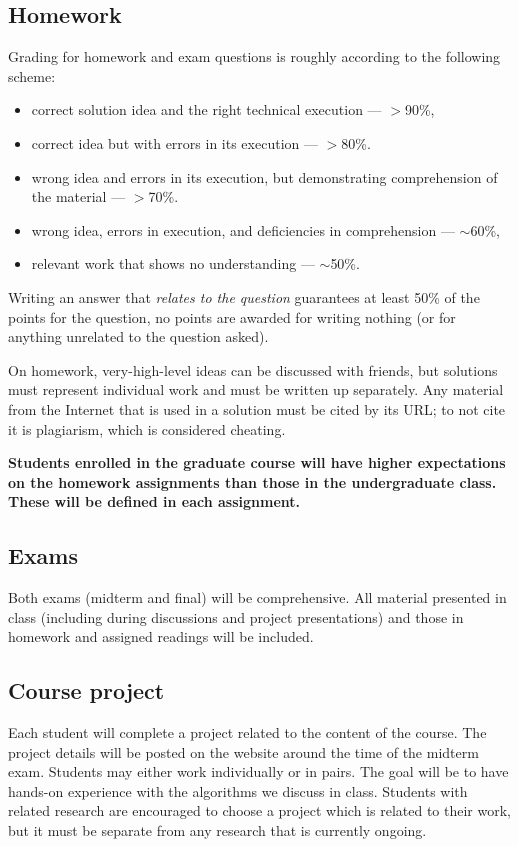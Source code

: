 \documentclass[12pt]{scrartcl}
\begin{document}
\subsection{Homework }

Grading for homework and exam questions is roughly according to the following scheme:
\begin{itemize}
\item correct solution idea and the right technical execution --- $>$90\%, 
\item correct idea but with errors in its execution --- $>$80\%. 
\item wrong idea and errors in its execution, but demonstrating comprehension of the material --- $>$70\%. 
\item wrong idea, errors in execution, and deficiencies in comprehension --- $\sim$60\%, 
\item relevant work that shows no understanding --- $\sim$50\%.
\end{itemize}
Writing an answer that \emph{relates to the question} guarantees at least 50\% of the points for the question, 
no points are awarded for writing nothing (or for anything unrelated to the question asked).

On homework, very-high-level ideas can be discussed with friends, but solutions must represent individual work and must be written up separately. 
Any material from the Internet that is used in a solution must be cited by its URL; to not cite it is plagiarism, which is considered cheating.

\textbf{Students enrolled in the graduate course will have higher expectations on the homework assignments than those in the undergraduate class. 
These will be defined in each assignment. }

\subsection{Exams}

Both exams (midterm and final) will be comprehensive. 
All material presented in class (including during discussions and project presentations) 
and those in homework and assigned readings will be included.

\subsection{Course project}
Each student will complete a project related to the content of the course. 
The project details will be posted on the website around the time of the midterm exam. 
Students may either work individually or in pairs. 
The goal will be to have hands-on experience with the algorithms we discuss in class. 
Students with related research are encouraged to choose a project which is related to their work, but it must be separate from any research that is currently ongoing.
\end{document}
